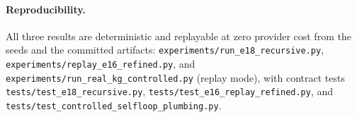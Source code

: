 \paragraph{Reproducibility.}
All three results are deterministic and replayable at zero provider cost
from the seeds and the committed artifacts:
\texttt{experiments/run\_e18\_recursive.py},
\texttt{experiments/replay\_e16\_refined.py}, and
\texttt{experiments/run\_real\_kg\_controlled.py} (replay mode), with
contract tests \texttt{tests/test\_e18\_recursive.py},
\texttt{tests/test\_e16\_replay\_refined.py}, and
\texttt{tests/test\_controlled\_selfloop\_plumbing.py}.
